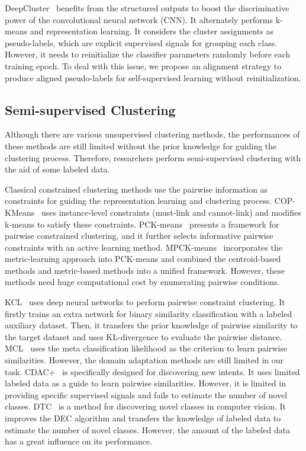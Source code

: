 \documentclass[letterpaper]{article} \usepackage{aaai21}  \usepackage{times}  \usepackage{helvet} \usepackage{courier}  \usepackage[hyphens]{url}  \usepackage{graphicx} \urlstyle{rm} \def\UrlFont{\rm}  \usepackage{natbib}  \usepackage{caption} \frenchspacing  \setlength{\pdfpagewidth}{8.5in}  \setlength{\pdfpageheight}{11in}  \usepackage{amsmath}
\begin{document}
	DeepCluster~\cite{caron2018deep} benefits from the structured outputs to boost the discriminative power of the convolutional neural network (CNN). It alternately performs k-means and representation learning. It considers the cluster assignments as pseudo-labels, which are explicit supervised signals for grouping each class. However, it needs to reinitialize the classifier parameters randomly before each training epoch. To deal with this issue, we propose an alignment strategy to produce aligned pseudo-labels for self-supervised learning without reinitialization.
	
	\subsection{Semi-supervised Clustering}
	Although there are various unsupervised clustering methods, the performances of these methods are still limited without the prior knowledge for guiding the clustering process. Therefore, researchers perform semi-supervised clustering with the aid of some labeled data.
	
	Classical constrained clustering methods use the pairwise information as constraints for guiding the representation learning and clustering process. COP-KMeans~\cite{Wagstaff2001} uses instance-level constraints (must-link and cannot-link) and modifies k-means to satisfy these constraints. PCK-means~\cite{basu2004active} presents a framework for pairwise constrained clustering, and it further selects informative pairwise constraints with an active learning method. MPCK-means~\cite{bilenko2004integrating} incorporates the metric-learning approach into PCK-means and combined the centroid-based methods and metric-based methods into a unified framework. However, these methods need huge computational cost by enumerating pairwise conditions. 
	
	KCL~\cite{hsu2018learning} uses deep neural networks to perform pairwise constraint clustering. It firstly trains an extra network for binary similarity classification with a labeled auxiliary dataset. Then, it transfers the prior knowledge of pairwise similarity to the target dataset and uses KL-divergence to evaluate the pairwise distance. MCL~\cite{hsu2018multiclass} uses the meta classification likelihood as the criterion to learn pairwise similarities. However, the domain adaptation methods are still limited in our task. CDAC+~\cite{lin2020discovering} is specifically designed for discovering new intents. It uses limited labeled data as a guide to learn pairwise similarities. However, it is limited in providing specific supervised signals and fails to estimate the number of novel classes. DTC~\cite{Han2019learning} is a method for discovering novel classes in computer vision. It improves the DEC algorithm and transfers the knowledge of labeled data to estimate the number of novel classes. However, the amount of the labeled data has a great influence on its performance.
	
\end{document}
